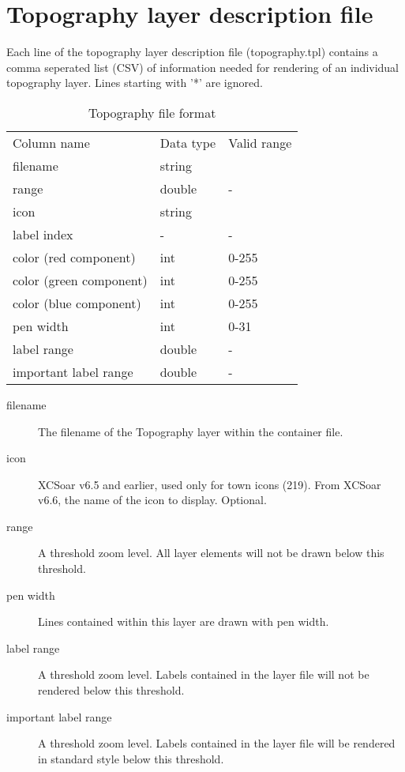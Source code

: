 \section{Topography layer description file}
Each line of the topography layer description file (topography.tpl) contains
a comma seperated list (CSV) of information needed for rendering of an
individual topography layer. Lines starting with '*' are ignored.
\begin{table}[ht]
\centering
\sffamily
\begin{tabular}{@{}lll@{}}
\toprule
\addlinespace
Column name&Data type&Valid range\\
\cmidrule(r){1-1}\cmidrule(lr){2-2}\cmidrule(l){3-3}
filename&string&\\
range&double&-\\
icon&string&\\
label index&-&-\\
color (red component)&int&0-255\\
color (green component)&int&0-255\\
color (blue component)&int&0-255\\
pen width&int&0-31\\
label range&double&-\\
important label range&double&-\\
\bottomrule
\end{tabular}
\caption{Topography file format}
\label{tab:topography-file-format}
\end{table}

\begin{description}
\item[filename] The filename of the Topography layer within the container file.
\item[icon] XCSoar v6.5 and earlier, used only for town icons (219). From XCSoar v6.6, the name of the icon to display. Optional.
\item[range] A threshold zoom level. All layer elements will not be drawn
below this threshold.
\item[pen width] Lines contained within this layer are drawn with pen width.
\item[label range] A threshold zoom level. Labels contained in the layer file
will not be rendered below this threshold.
\item[important label range] A threshold zoom level. Labels contained
in the layer file will be rendered in standard style below this threshold.
\end{description}
